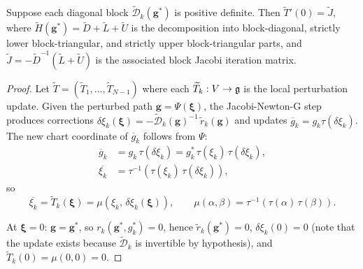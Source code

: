 \begin{lemma}\label{lem:chart-iteration-jacobian}
	Suppose each diagonal block $\widetilde{\mathcal{D}}_k(\mathbf{g}^*)$ is positive definite.
	Then $\widetilde{T}'(0) = \widetilde{J}$, where $\widetilde{H}(\mathbf{g}^*) = \widetilde{D} + \widetilde{L} + \widetilde{U}$ is the decomposition into block-diagonal, strictly lower block-triangular, and strictly upper block-triangular parts, and $\widetilde{J} = -\widetilde{D}^{-1}(\widetilde{L} + \widetilde{U})$ is the associated block Jacobi iteration matrix.
\end{lemma}
\begin{proof}
	Let $\widetilde{T} = (\widetilde{T}_1, \ldots, \widetilde{T}_{N-1})$ where each $\widetilde{T}_k : V \to {\mathfrak{g}}$ is the local perturbation update.
	Given the perturbed path $\mathbf{g} = \Psi(\boldsymbol \xi)$, the Jacobi-Newton-G step produces corrections $\delta \xi_k(\boldsymbol \xi) = -\widetilde{\mathcal{D}}_k(\mathbf{g})^{-1}\, \widetilde{r}_k(\mathbf{g})$ and updates $\overline{g}_k = g_k\tau(\delta \xi_k)$.
	The new chart coordinate of $\overline{g}_k$ follows from $\Psi$:
	\[
		\begin{aligned}
			\overline{g}_k   & = g_k\,\tau(\delta\xi_k) = g_k^*\,\tau(\xi_k)\,\tau(\delta\xi_k), \\
			\overline{\xi_k} & = \tau^{-1}\!\left(\tau(\xi_k)\,\tau(\delta\xi_k)\right),
		\end{aligned}
	\]
	so
	\begin{equation}
		\overline{\xi_k} = \widetilde{T}_k(\boldsymbol \xi) = \mu(\xi_k,\, \delta \xi_k(\boldsymbol \xi)),
		\qquad \mu(\alpha, \beta) = \tau^{-1}(\tau(\alpha)\,\tau(\beta)).
		\label{eq:Tk-mu}
	\end{equation}

	At $\boldsymbol \xi = 0$: $\mathbf{g} = \mathbf{g}^*$, so $r_k(\mathbf{g}^*, g_k^*) = 0$, hence $\widetilde{r}_k(\mathbf{g}^*) = 0$, $\delta \xi_k(0) = 0$ (note that the update exists because $\widetilde{\mathcal{D}}_k$ is invertible by hypothesis), and $\widetilde{T}_k(0) = \mu(0,0) = 0$.


\end{proof}
